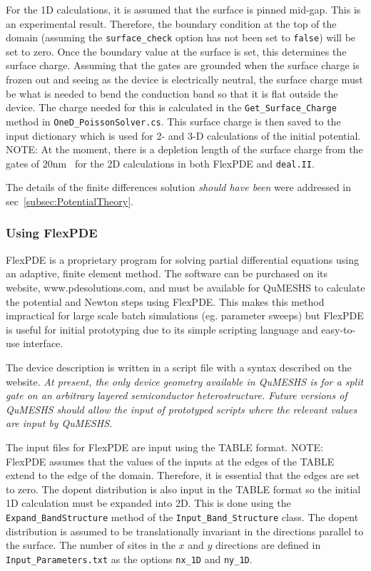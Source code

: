 \documentclass[12pt]{article}
\newcommand{\red}[1]{{\color{red} \it #1}}
\begin{document}
{For the 1D calculations, it is assumed that the surface is pinned mid-gap.  This is an
experimental result.  Therefore, the boundary condition at the top of the domain (assuming the
\texttt{surface\_check} option has not been set to \texttt{false}) will be set to zero.  Once
the boundary value at the surface is set, this determines the surface charge.  Assuming that
the gates are grounded when the surface charge is frozen out and seeing as the device is
electrically neutral, the surface charge must be what is needed to bend the conduction band
so that it is flat outside the device.  The charge needed for this is calculated in the
\texttt{Get\_Surface\_Charge} method in \texttt{OneD\_PoissonSolver.cs}.  This surface
charge is then saved to the input dictionary which is used for 2- and 3-D calculations
of the initial potential.  {\color{red} NOTE:} At the moment, there is a depletion length
of the surface charge from the gates of 20nm~\cite{Laux:19??} for the 2D calculations in
both FlexPDE and \texttt{deal.II}.

The details of the finite differences solution \red{should have been} were addressed in
sec~\ref{subsec:PotentialTheory}.


\subsubsection{Using FlexPDE}
\label{subsubsec:UsingFlexPDE}

FlexPDE is a proprietary program for solving partial differential equations using
an adaptive, finite element method.  The software can be purchased on its website,
www.pdesolutions.com, and must be available for QuMESHS to calculate the potential
and Newton steps using FlexPDE.  This makes this method impractical for large scale
batch simulations (eg. parameter sweeps) but FlexPDE is useful for initial prototyping
due to its simple scripting language and easy-to-use interface.

The device description is written in a script file with a syntax described on the
website.  \red{At present, the only device geometry available in QuMESHS is for
a split gate on an arbitrary layered semiconductor heterostructure.  Future versions
of QuMESHS should allow the input of prototyped scripts where the relevant values
are input by QuMESHS.}

The input files for FlexPDE are input using the TABLE format.  {\color{red} NOTE:}
FlexPDE assumes that the values of the inputs at the edges of the TABLE extend
to the edge of the domain.  Therefore, it is essential that the edges are set to zero.
The dopent distribution is also input in the TABLE format so the initial 1D
calculation must be expanded into 2D.  This is done using the \texttt{Expand\_BandStructure}
method of the \texttt{Input\_Band\_Structure} class.  The dopent distribution is assumed
to be translationally invariant in the directions parallel to the surface.  The number
of sites in the $x$ and $y$ directions are defined in \texttt{Input\_Parameters.txt} as
the options \texttt{nx\_1D} and \texttt{ny\_1D}.


}
\end{document}
